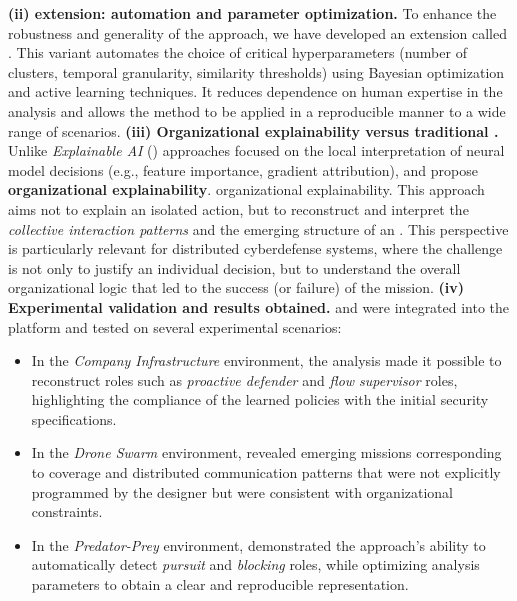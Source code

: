         \medskip
        \noindent
        \textbf{(ii)  extension: automation and parameter optimization.}
        To enhance the robustness and generality of the approach, we have developed an extension called \textbf{}.
        This variant automates the choice of critical hyperparameters (number of clusters, temporal granularity, similarity thresholds) using Bayesian optimization and active learning techniques.
        It reduces dependence on human expertise in the analysis and allows the method to be applied in a reproducible manner to a wide range of scenarios.
        \medskip
        \noindent
        \textbf{(iii) Organizational explainability versus traditional .}
        Unlike \textit{Explainable AI} () approaches focused on the local interpretation of neural model decisions (e.g., feature importance, gradient attribution),  and  propose \textbf{organizational explainability}. {organizational explainability}.
        This approach aims not to explain an isolated action, but to reconstruct and interpret the \textit{collective interaction patterns} and the emerging structure of an .
        This perspective is particularly relevant for distributed cyberdefense systems, where the challenge is not only to justify an individual decision, but to understand the overall organizational logic that led to the success (or failure) of the mission.
        \medskip
        \noindent
        \textbf{(iv) Experimental validation and results obtained.}
         and  were integrated into the  platform and tested on several experimental scenarios:
        \begin{itemize}
          \item In the \textit{Company Infrastructure} environment, the analysis made it possible to reconstruct roles such as \textit{proactive defender} and \textit {flow supervisor} roles, highlighting the compliance of the learned policies with the initial security specifications.

          \item In the \textit{Drone Swarm} environment,  revealed emerging missions corresponding to coverage and distributed communication patterns that were not explicitly programmed by the designer but were consistent with organizational constraints.
          \item In the \textit{Predator-Prey} environment,  demonstrated the approach's ability to automatically detect \textit{pursuit} and \textit{blocking} roles, while optimizing analysis parameters to obtain a clear and reproducible representation.
        \end{itemize}
